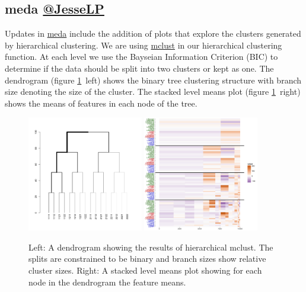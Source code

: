 \documentclass[simplex.tex]{subfiles}
\begin{document}
\subsection[meda]{meda \href{https://github.com/mrae}{@JesseLP}}

Updates in \href{https://github.com/neurodata/meda}{meda} include the
addition of plots that explore the clusters generated by
hierarchical clustering.  We are using 
\href{http://www.stat.washington.edu/fraley/mclust/}{mclust}
in our
hierarchical clustering function.  At each level we use the Bayseian
Information Criterion (BIC) to determine if the data should be split
into two clusters or kept as one.  The dendrogram 
(figure \ref{fig:meda}~left)
shows the binary tree clustering structure with branch size denoting the
size of the cluster.  The stacked level means plot
(figure \ref{fig:meda}~right) shows the means of features in each node 
of the tree.


\begin{figure}[!h]
\begin{cframed}
\centering
\includegraphics[width=0.45\textwidth, clip = true, trim = 2cm 5cm 4cm 6cm ]{../../figs/K15_samp1e4_01e3_dendro.png}
\includegraphics[width=0.45\textwidth, clip = true, trim = 1cm 0 5mm 1mm]{../../figs/K15_samp1e4_01e3_slcmeans.png}
\caption{Left:  A dendrogram showing the results of hierarchical mclust.
The splits are constrained to be binary and branch sizes show relative
cluster sizes.  Right: A stacked level means plot showing for each node
in the dendrogram the feature means.}
\label{fig:meda}
\end{cframed}
\end{figure}

\clearpage
\end{document}
